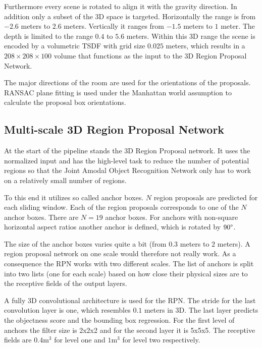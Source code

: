 \documentclass[12pt]{scrartcl}
\begin{document}
Furthermore every scene is rotated to align it with the gravity direction.
In addition only a subset of the 3D space is targeted. Horizontally the range
is from \(-2.6\) meters to \(2.6\) meters. Vertically it ranges from \(-1.5\)
meters to \(1\) meter. The depth is limited to the range \(0.4\) to \(5.6\)
meters. Within this 3D range the scene is encoded by a volumetric TSDF with
grid size \(0.025\) meters, which results in a \(208 \times 208 \times 100\)
volume that functions as the input to the 3D Region Proposal Network.

The major directions of the room are used for the orientations of the proposals.
RANSAC plane fitting is used under the Manhattan world assumption to calculate
the proposal box orientations.

\subsection{Multi-scale 3D Region Proposal Network}

At the start of the pipeline stands the 3D Region Proposal network. It uses the
normalized input and has the high-level task to reduce the number of potential
regions so that the Joint Amodal Object Recognition Network only has to work on
a relatively small number of regions.

To this end it utilizes so called anchor boxes. \(N\) region proposals are predicted
for each sliding window. Each of the region proposals corresponds to one of the
\(N\) anchor boxes. There are \(N = 19\) anchor boxes. For anchors with non-square
horizontal aspect ratios another anchor is defined, which is rotated by \(90 \degree\).

The size of the anchor boxes varies quite a bit (from \(0.3\) meters to \(2\)
meters). A region proposal network on one scale would therefore not really work.
As a consequence the RPN works with two different scales. The list of anchors
is split into two lists (one for each scale) based on how close their physical
sizes are to the receptive fields of the output layers.

A fully 3D convolutional architecture is used for the RPN. The stride for the last
convolution layer is one, which resembles \(0.1\) meters in 3D. The last layer
predicts the objectness score and the bounding box regression. For the first level
of anchors the filter size is 2x2x2 and for the second layer it is 5x5x5. The
receptive fields are \(0.4 \text{m}^3\) for level one and \(1 \text{m}^3\) for
level two respectively.
\end{document}

